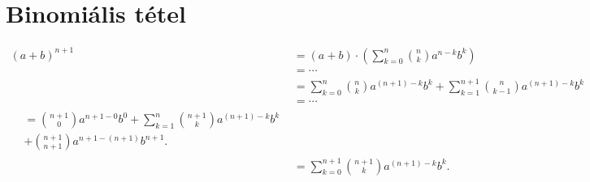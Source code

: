 \documentclass{article}
\begin{document}
\section{Binomiális tétel}
\begin{subequations}
\begin{align}
(a + b)^{n + 1} &= (a + b) \cdot \left( \sum_{k = 0}^n \binom{n}{k} a^{n - k} b^k \right) \\
&= \cdots \nonumber \\
&= \sum_{k = 0}^n \binom{n}{k} a^{(n + 1) - k} b^k + \sum_{k = 1}^{n + 1} \binom{n}{k - 1} a^{(n + 1) - k} b^{k} \\
&= \cdots \nonumber \\
\begin{split}
&= \binom{n + 1}{0} a^{n + 1 - 0} b^0 + \sum_{k = 1}^n \binom{n + 1}{k} a^{(n + 1) - k} b^k \\
&+ \binom{n + 1}{n + 1} a^{n + 1 - (n + 1)} b^{n + 1} \text{.}
\end{split} \\
&= \sum_{k = 0}^{n + 1} \binom{n + 1}{k} a^{(n + 1) - k} b^k \text{.}
\end{align}
\end{subequations}
\end{document}
